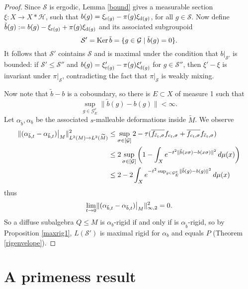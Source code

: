 \documentclass[a4paper,11pt]{article}
\numberwithin{equation}{section}
\newtheorem{thm}{Theorem}[section]
\theoremstyle{definition}
\theoremstyle{remark}
\numberwithin{equation}{section}
\newcommand{\rG}{\mathcal{G}}
\def\H{\mathcal H}
\def\r{{\rm r}}
\def\d{{\rm d}}
\providecommand{\norm}[1]{\lVert#1\rVert}
\newcommand{\lr}[1]{\left(#1\right)}
\newcommand*\cls[1]{\overline{#1}}
\numberwithin{equation}{section}
\begin{document}
\begin{proof}
    Since $\mathcal S$ is ergodic, Lemma \ref{bound} gives a measurable section $\xi:X\to X\ast \H$, such that $b(g)=\xi_{\r(g)}-\pi(g)\xi_{\d(g)}$, for all $g\in \mathcal S$. Now define $\tilde b(g):=b(g)-\xi_{\r(g)}+\pi(g)\xi_{\d(g)}$ and its associated subgroupoid
    $$
    \mathcal S'={\rm Ker}\,\tilde b=\{g\in\rG\mid \tilde b(g)=0\}.
    $$
    It follows that $\mathcal S'$ cointains $\mathcal S$ and is maximal under the condition that $b|_{\mathcal{S}'}$ is bounded: if $\mathcal S'\leq \mathcal S''$ and $b(g)=\xi_{\r(g)}'-\pi(g)\xi_{\d(g)}'$ for $g\in \mathcal S''$, then $\xi'-\xi$ is invariant under $\pi|_\mathcal{S}$, contradicting the fact that $\pi|_\mathcal{S}$ is weakly mixing.
    
    Now note that $\tilde b-b$ is a coboundary, so there is $E\subset X$ of measure 1 such that
    $$
    \sup_{g\in \rG_E^x} \norm{\tilde b(g)-b(g)}<\infty.
    $$ Let $\alpha_{\tilde b},\alpha_{b}$ be the associated $s$-malleable deformations inside $\widetilde M$. We observe \begin{align*}
        \norm{(\alpha_{\tilde b,t}-\alpha_{\tilde b,t})\big{|}_M}_{L^2(M)\to L^2(\widetilde M)}^2&\leq \sup_{\sigma\in [\rG]} 2-\tau(\overline{f_{\tilde{c}_t,\sigma}}f_{{c}_t,\sigma}+\overline{f_{{c}_t,\sigma}}f_{\tilde{c}_t,\sigma}) \\ 
        &\leq 2\sup_{\sigma\in [\rG]} \lr{1-\int_{X} e^{-t^2\norm{\tilde b(x\sigma)-b(x\sigma)}^2}\dd{\mu(x)}} \\ 
        &\leq 2-2\int_{X} e^{-t^2\sup_{g\in \rG_E^x} \norm{\tilde b(g)-b(g)}^2}\dd{\mu(x)}
    \end{align*} thus $$
    \lim_{t\to 0} \norm{(\alpha_{\tilde b,t}-\alpha_{\tilde b,t})\big{|}_M}_{\infty,2}^2=0.
    $$ So a diffuse subalgebra $Q\leq M$ is $\alpha_{b}$-rigid if and only if is $\alpha_{\tilde b}$-rigid, so by Proposition \ref{maxrig1}, $L(\mathcal S')$ is maximal rigid for $\alpha_b$ and equals $P$ (Theorem \ref{rigenvelope}).
\end{proof}


\section{A primeness result}

%
%
\end{document}
